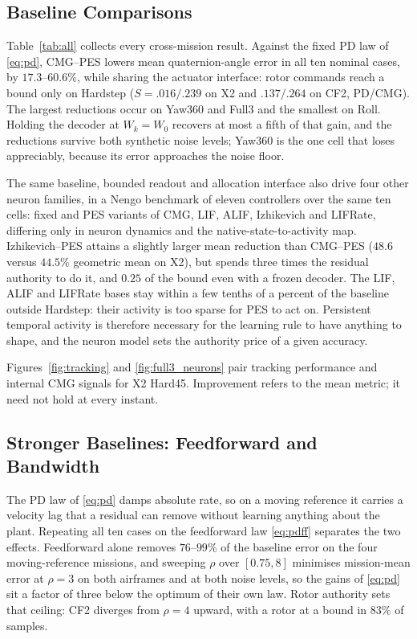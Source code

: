 \documentclass[letterpaper, 10 pt, conference]{ieeeconf}
\begin{document}
\subsection{Baseline Comparisons}
\label{sec:matrix}
Table~\ref{tab:all} collects every cross-mission result. Against the fixed PD
law of \eqref{eq:pd}, CMG--PES lowers mean quaternion-angle error in all ten
nominal cases, by $17.3$--$60.6\%$, while sharing the actuator interface: rotor
commands reach a bound only on Hardstep ($S=.016/.239$ on X2 and $.137/.264$ on
CF2, PD/CMG). The largest reductions occur on Yaw360 and Full3 and the smallest
on Roll. Holding the decoder at $W_k=W_0$ recovers at most a fifth of that gain,
and the reductions survive both synthetic noise levels; Yaw360 is the one cell
that loses appreciably, because its error approaches the noise floor.

The same baseline, bounded readout and allocation interface also drive four other neuron
families, in a Nengo benchmark of eleven controllers over the same ten cells: fixed and
PES variants of CMG, LIF, ALIF, Izhikevich \cite{izhikevich2003} and LIFRate, differing
only in neuron dynamics and the native-state-to-activity map. Izhikevich--PES
attains a slightly larger mean reduction than CMG--PES ($48.6$ versus $44.5\%$
geometric mean on X2), but spends three times the residual authority to do it,
and $0.25$ of the bound even with a frozen decoder. The LIF, ALIF and LIFRate
bases stay within a few tenths of a percent of the baseline outside Hardstep:
their activity is too sparse for PES to act on. Persistent temporal activity is
therefore necessary for the learning rule to have anything to shape, and the
neuron model sets the authority price of a given accuracy.

Figures~\ref{fig:tracking} and \ref{fig:full3_neurons} pair tracking
performance and internal CMG signals for X2 Hard45. Improvement refers to the
mean metric; it need not hold at every instant.

\subsection{Stronger Baselines: Feedforward and Bandwidth}
\label{sec:ladder}
The PD law of \eqref{eq:pd} damps absolute rate, so on a moving reference it
carries a velocity lag that a residual can remove without learning anything
about the plant. Repeating all ten cases on the feedforward law \eqref{eq:pdff}
separates the two effects. Feedforward alone removes $76$--$99\%$ of the
baseline error on the four moving-reference missions, and sweeping $\rho$ over
$[0.75,8]$ minimises mission-mean error at $\rho=3$ on both airframes and at
both noise levels, so the gains of \eqref{eq:pd} sit a factor of three below the
optimum of their own law. Rotor authority sets that ceiling: CF2 diverges from
$\rho=4$ upward, with a rotor at a bound in $83\%$ of samples.
\end{document}
